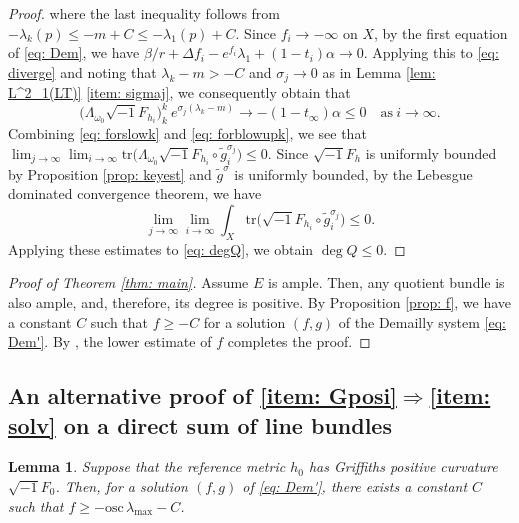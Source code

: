 \documentclass[a4, 12pt, 
]{amsart}
\numberwithin{equation}{section}
\theoremstyle{plain}
\newtheorem{lem}[equation]{Lemma}
\theoremstyle{definition}
\theoremstyle{remark}
\begin{document}
\begin{proof}
    where the last inequality follows from $-\lambda_k(p)\le-m+C\le-\lambda_1(p)+C$. Since $f_i\to-\infty$ on $X$, by the first equation of \eqref{eq: Dem}, we have $\beta/r+\Delta f_i-e^{f_i}\lambda_1+(1-t_i)\alpha\to0$. Applying this to \eqref{eq: diverge} and noting that $\lambda_k-m>-C$ and $\sigma_j\to0$ as in Lemma \ref{lem: L^2_1(LT)} \eqref{item: sigmaj}, we consequently obtain that
    \begin{equation}\label{eq: forblowupk}
         \big(\Lambda_{\omega_0}\sqrt{-1}F_{h_i}\big)^k_k \ e^{\sigma_j(\lambda_k-m)}\to -(1-t_\infty)\alpha\le0 \quad \mathrm{as} \ i\to\infty.
    \end{equation}
    Combining \eqref{eq: forslowk} and \eqref{eq: forblowupk}, we see that $\lim_{j\to\infty}\lim_{i\to\infty}\mathrm{tr}\big(\Lambda_{\omega_0}\sqrt{-1}F_{h_i}\circ\tilde{g}^{\sigma_j}_i\big)\le0$. Since $\sqrt{-1}F_h$ is uniformly bounded by Proposition \ref{prop: keyest} and $\tilde{g}^\sigma$ is uniformly bounded, by the Lebesgue dominated convergence theorem, we have 
    $$\lim_{j\to\infty}\lim_{i\to\infty}\int_{X}\mathrm{tr}\big(\sqrt{-1}F_{h_i}\circ\tilde{g}^{\sigma_j}_i\big)\le0.$$
    Applying these estimates to \eqref{eq: degQ}, we obtain $\deg Q\le 0$.
\end{proof}

\begin{proof}[Proof of Theorem \ref{thm: main}]
    Assume $E$ is ample. Then, any quotient bundle is also ample, and, therefore, its degree is positive. By Proposition \ref{prop: f}, we have a constant $C$ such that $f\ge -C$ for a solution $(f,g)$ of the Demailly system \eqref{eq: Dem'}. By \cite[Theorem 1.2]{Pin23}, the lower estimate of $f$ completes the proof.
\end{proof}

\subsection{An alternative proof of \eqref{item: Gposi}$\Rightarrow$\eqref{item: solv} on a direct sum of line bundles}\label{sec: alt}

\begin{lem}\label{lem: Gposi}
    Suppose that the reference metric $h_0$ has Griffiths positive curvature $\sqrt{-1}F_0$. Then, for a solution $(f,g)$ of \eqref{eq: Dem'}, there exists a constant $C$ such that $f\ge -\mathrm{osc}\, \lambda_{\mathrm{max}}-C$.
\end{lem}
\end{document}
